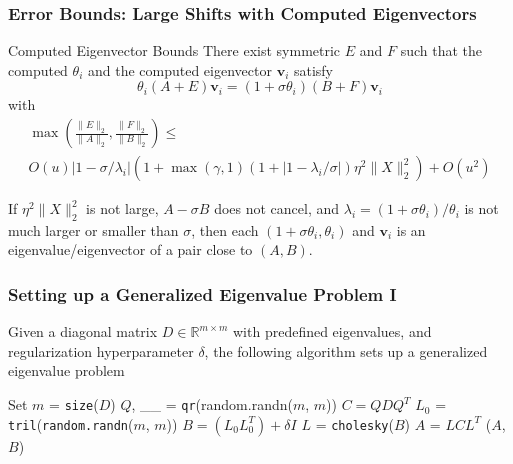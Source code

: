 \documentclass[landscape]{beamer}
\renewcommand{\vec}[1]{\bm{#1}}
\newcommand{\comm}[1]{\added[comment={#1}]{}}
\begin{document}
\begin{frame}
  \frametitle{Error Bounds: Large Shifts with Computed Eigenvectors}

  \begin{block}{Computed Eigenvector Bounds}
    There exist symmetric $E$ and $F$ such that the computed
    $\theta_i$ and the computed eigenvector $\vec{v}_i$ satisfy
    \begin{equation*}
      \theta_i (A+E) \vec{v}_i = (1+\sigma \theta_i) (B+F) \vec{v}_i
    \end{equation*}
    with
    \begin{multline*}
      \max\left(\frac{\|E\|_2}{\|A\|_2}, \frac{\|F\|_2}{\|B\|_2}\right) \leq  \\
      O(u) |1-\sigma/\lambda_i| \left(1 + \max(\gamma,1)
      \left(1+ |1-\lambda_i/\sigma|\right)\eta^2\|X\|_2^2\right) + O(u^2)
    \end{multline*}
  \end{block}
  If $\eta^2 \|X\|_2^2$ is not large, $A-\sigma B$ does not cancel,
  and $\lambda_i = (1+\sigma\theta_i)/\theta_i$ is not much larger or
  smaller than $\sigma$, then each $(1+\sigma \theta_i, \theta_i)$ and
  $\vec{v}_i$ is an eigenvalue/eigenvector of a pair close to $(A,B)$.
\end{frame}

\begin{frame}
  \frametitle{Setting up a Generalized Eigenvalue Problem I\comm{You could add
      a slide before this one reminding the audience that we want to see to
      what extent the residual bounds from the previous slides might transfer
      over to the ST Lanczos algorithm.}}

	Given a diagonal matrix $D \in \mathbb{R}^{m \times m}$ with predefined eigenvalues, and regularization hyperparameter $\delta$, the following algorithm sets up a generalized eigenvalue problem
		\begin{algorithmic}[1]
		\State Set $m$ = \texttt{size}($D$)
		\State $Q$, \_\_ = \texttt{qr}(random.randn($m$, $m$))
		\State $C = QDQ^T$
		\State $L_{0}$ = \texttt{tril}(\texttt{random.randn}($m$, $m$))
		\State $B = (L_0 L_0^T) + \delta I$
		\State $L$ = \texttt{cholesky}($B$)
		\State $A$ = $LCL^T$
		\State \Return ($A$, $B$)
		\EndFunction
	\end{algorithmic}
\end{frame}
\end{document}
